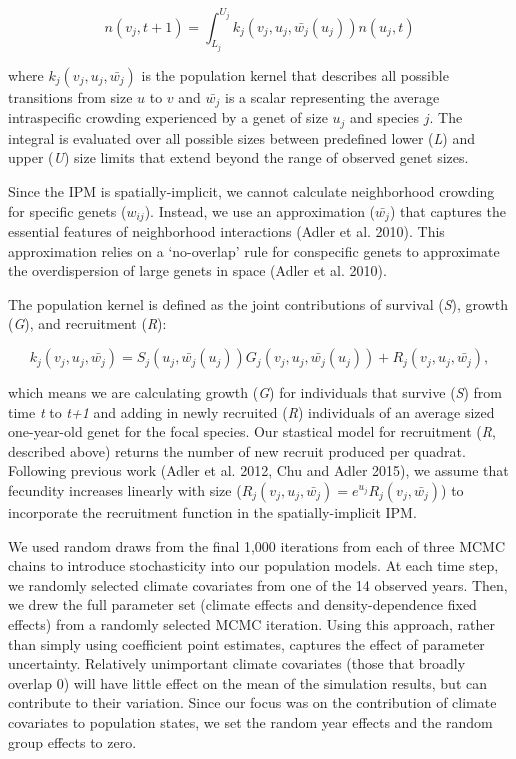 \documentclass[12pt,]{article}
\begin{document}
\begin{equation}
n(v_{j},t+1) = \int_{L_{j}}^{U_{j}} k_{j}(v_{j},u_{j},\bar{w_{j}}(u_{j}))n(u_{j},t)
\end{equation}

where \(k_{j}(v_{j},u_{j},\bar{w_{j}})\) is the population kernel that
describes all possible transitions from size \(u\) to \(v\) and
\(\bar{w_{j}}\) is a scalar representing the average intraspecific
crowding experienced by a genet of size \(u_j\) and species \(j\). The
integral is evaluated over all possible sizes between predefined lower
(\emph{L}) and upper (\emph{U}) size limits that extend beyond the range
of observed genet sizes.

Since the IPM is spatially-implicit, we cannot calculate neighborhood
crowding for specific genets (\(w_{ij}\)). Instead, we use an
approximation (\(\bar{w_{j}}\)) that captures the essential features of
neighborhood interactions (Adler et al. 2010). This approximation relies
on a `no-overlap' rule for conspecific genets to approximate the
overdispersion of large genets in space (Adler et al. 2010).

The population kernel is defined as the joint contributions of survival
(\emph{S}), growth (\emph{G}), and recruitment (\emph{R}):

\begin{equation}
k_{j}(v_{j},u_{j},\bar{w_{j}}) = S_j(u_j, \bar{w_{j}}(u_{j}))G_j(v_{j},u_{j},\bar{w_{j}}(u_{j})) + R_j(v_{j},u_{j},\bar{w_{j}}),
\end{equation}

which means we are calculating growth (\emph{G}) for individuals that
survive (\emph{S}) from time \emph{t} to \emph{t+1} and adding in newly
recruited (\emph{R}) individuals of an average sized one-year-old genet
for the focal species. Our stastical model for recruitment (\emph{R},
described above) returns the number of new recruit produced per quadrat.
Following previous work (Adler et al. 2012, Chu and Adler 2015), we
assume that fecundity increases linearly with size
(\(R_j(v_{j},u_{j},\bar{w_{j}}) = e^{u_j}R_j(v_{j},\bar{w_{j}})\)) to
incorporate the recruitment function in the spatially-implicit IPM.

We used random draws from the final 1,000 iterations from each of three
MCMC chains to introduce stochasticity into our population models. At
each time step, we randomly selected climate covariates from one of the
14 observed years. Then, we drew the full parameter set (climate effects
and density-dependence fixed effects) from a randomly selected MCMC
iteration. Using this approach, rather than simply using coefficient
point estimates, captures the effect of parameter uncertainty.
Relatively unimportant climate covariates (those that broadly overlap 0)
will have little effect on the mean of the simulation results, but can
contribute to their variation. Since our focus was on the contribution
of climate covariates to population states, we set the random year
effects and the random group effects to zero.
\end{document}
